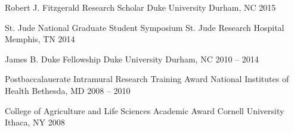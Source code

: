 

\begin{cvhonors}


  \cvhonor
    {Robert J. Fitzgerald Research Scholar} %
    {Duke University} %
    {Durham, NC} %
    {2015} %


  \cvhonor
    {St. Jude National Graduate Student Symposium} %
    {St. Jude Research Hospital} %
    {Memphis, TN} %
    {2014} %


  \cvhonor
    {James B. Duke Fellowship} %
    {Duke University} %
    {Durham, NC} %
    {2010 -- 2014} %


  \cvhonor
    {Postbaccalauerate Intramural Research Training Award} %
    {National Institutes of Health} %
    {Bethesda, MD} %
    {2008 -- 2010} %

  \cvhonor
    {College of Agriculture and Life Sciences Academic Award}
    {Cornell University} %
    {Ithaca, NY} %
    {2008} %



\end{cvhonors}

